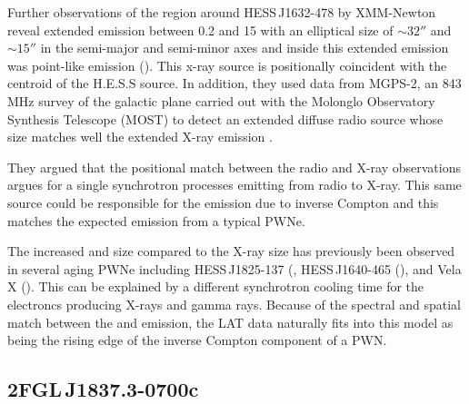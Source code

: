 \documentclass[12pt,preprint]{aastex}
\newcommand{\kev}{\text{Kev}\xspace}
\newcommand{\gev}{\text{GeV}\xspace}
\newcommand{\tev}{\text{TeV}\xspace}
\renewcommand{\approx}{\sim\!\xspace}
\begin{document}
Further observations of the region around HESS\,J1632-478 by XMM-Newton
reveal extended emission between 0.2 \kev and 15 \kev with an elliptical
size of $\approx32''$ and $\approx15''$ in the semi-major and semi-minor
axes and inside this extended emission was point-like emission
(\cite{hess_j1632_478_xmm_newton}).  This x-ray source is positionally
coincident with the \tev centroid of the H.E.S.S source.  In addition,
they used data from MGPS-2, an 843 MHz survey of the galactic plane
carried out with the Molonglo Observatory Synthesis Telescope (MOST)
to detect an extended diffuse radio source whose size matches well the
extended X-ray emission \cite{most_survey_galactic_plane}.

They argued that the positional match between the radio and X-ray
observations argues for a single synchrotron processes emitting from
radio to X-ray.  This same source could be responsible for the \tev
emission due to inverse Compton and this matches the expected emission
from a typical PWNe.

The increased \gev and \tev size compared to the X-ray size
has previously been observed in several aging PWNe including 
HESS\,J1825-137 (\cite{hess_j1825_xmm_newton,hess_j1825_hess}, HESS\,J1640-465
(\cite{hess_plane_survey,xmm_newton_hess_j_1640-466}),
and Vela X (\cite{vela_x_rosat,vela_x_hess}). 
This can be explained by a different synchrotron cooling
time for the electroncs producing X-rays and \tev gamma rays.
Because of the spectral and spatial match between the \gev and \tev
emission, the LAT data naturally fits into this model as being the rising
edge of the inverse Compton component of a PWN.

\subsection{2FGL\,J1837.3-0700c}
\label{section_2FGL_J1837.3-0700c}



\end{document}
